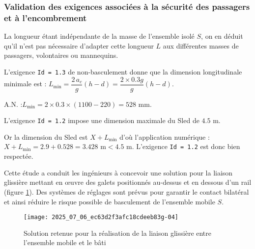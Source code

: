 \subsubsection{Validation des exigences associées à la sécurité des passagers et à l'encombrement \label{ccs_mp_2022_sec_2B3}}
\ifprof
\begin{corrige}
La longueur étant indépendante de la masse de l'ensemble isolé $S$, on en déduit qu'il n'est pas nécessaire d'adapter cette longueur $L$ aux différentes masses de passagers, volontaires ou mannequins.
\end{corrige}
\else
\fi


\ifprof
\begin{corrige}
L'exigence \texttt{Id = 1.3} de non-basculement donne que la dimension longitudinale minimale est :
$ L_\text{min} = \dfrac{2\,a_c}{g} (h - d) = \dfrac{2\times 0.3 g}{g} (h - d)$.

A.N. :$ L_\text{min} = 2 \times 0.3 \times (1100 - 220) = 528 \text{ mm}$.
\end{corrige}
\else
\fi


\ifprof
\begin{corrige}
L'exigence \texttt{Id = 1.2} impose une dimension maximale du Sled de $4.5$ m. 

Or la dimension du Sled est $X+L_\text{min}$ d'où l'application numérique :
$ X + L_\text{min} = 2.9 + 0.528 = 3.428 \text{ m} < 4.5 \text{ m}$. 
L'exigence \texttt{Id = 1.2} est donc bien respectée.
\end{corrige}
\else
\fi

\ifprof
\else

\ifprof
\else
Cette étude a conduit les ingénieurs à concevoir une solution pour la liaison glissière mettant en œuvre des galets positionnés au-dessus et en dessous d'un rail (figure \ref{ccs_mp_2022_fig_06}). Des systèmes de réglages sont prévus pour garantir le contact bilatéral et ainsi réduire le risque possible de basculement de l'ensemble mobile $S$.\\
\fi

\begin{figure}[!h]
\centering
\texttt{[image: 2025\_07\_06\_ec63d2f3afc18cdeeb83g-04]}

\caption{\label{ccs_mp_2022_fig_06}Solution retenue pour la réalisation de la liaison glissière entre l'ensemble mobile et le bâti}
\end{figure}
\fi
